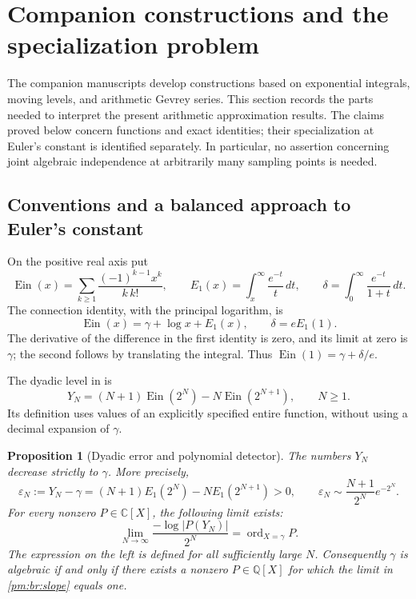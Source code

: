\documentclass[11pt,a4paper]{article}
\newtheorem{proposition}[theorem]{Proposition}
\theoremstyle{definition}
\theoremstyle{remark}
\numberwithin{equation}{section}
\begin{document}
\section{Companion constructions and the specialization problem}
\label{pm:br:section}

The companion manuscripts \cite{pm:KEIO001,pm:KEIO002} develop constructions
based on exponential integrals, moving levels, and arithmetic Gevrey
series.  This section records the parts needed to interpret the present
arithmetic approximation results.  The claims proved below concern
functions and exact identities; their specialization at Euler's constant
is identified separately.  In particular, no assertion concerning joint
algebraic independence at arbitrarily many sampling points is needed.

\subsection{Conventions and a balanced approach to Euler's constant}

On the positive real axis put
\[
 \operatorname{Ein}(x)=\sum_{k\geq1}\frac{(-1)^{k-1}x^k}{k\,k!},
 \qquad E_1(x)=\int_x^\infty\frac{e^{-t}}t\,dt,
 \qquad \delta=\int_0^\infty\frac{e^{-t}}{1+t}\,dt.
\]
The connection identity, with the principal logarithm, is
\begin{equation}\label{pm:br:connection}
 \operatorname{Ein}(x)=\gamma+\log x+E_1(x),
 \qquad \delta=eE_1(1).
\end{equation}
The derivative of the difference in the first identity is zero, and its
limit at zero is \(\gamma\); the second follows by translating the
integral.  Thus \(\operatorname{Ein}(1)=\gamma+\delta/e\).

The dyadic level in \cite{pm:KEIO001,pm:KEIO002} is
\begin{equation}\label{pm:br:dyadic}
 Y_N=(N+1)\operatorname{Ein}(2^N)
          -N\operatorname{Ein}(2^{N+1}),\qquad N\geq1.
\end{equation}
Its definition uses values of an explicitly specified entire function,
without using a decimal expansion of \(\gamma\).

\begin{proposition}[Dyadic error and polynomial detector]
\label{pm:br:dyadic-detector}
The numbers \(Y_N\) decrease strictly to \(\gamma\).  More precisely,
\[
 \varepsilon_N:=Y_N-\gamma
 =(N+1)E_1(2^N)-NE_1(2^{N+1})>0,
 \qquad
 \varepsilon_N\sim\frac{N+1}{2^N}e^{-2^N}.
\]
For every nonzero \(P\in\mathbb C[X]\), the following limit exists:
\begin{equation}\label{pm:br:slope}
 \lim_{N\to\infty}\frac{-\log|P(Y_N)|}{2^N}
       =\operatorname{ord}_{X=\gamma}P.
\end{equation}
The expression on the left is defined for all sufficiently large \(N\).
Consequently \(\gamma\) is algebraic if and only if there exists a
nonzero \(P\in\mathbb Q[X]\) for which the limit in
\eqref{pm:br:slope} equals one.
\end{proposition}
\end{document}
